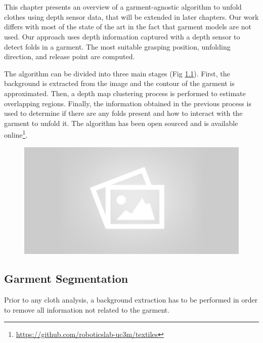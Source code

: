 \chapter{\MyTitle}
\label{architecture}

This chapter presents an overview of a garment-agnostic algorithm to unfold clothes using depth sensor data, that will be extended in later chapters. Our work differs with most of the state of the art in the fact that garment models are not used. Our approach uses depth information captured with a depth sensor to detect folds in a garment. The most suitable grasping position, unfolding direction, and release point are computed.

The algorithm can be divided into three main stages (Fig \ref{fig:pipeline_block_diagram}). First, the  background is extracted from the image and the contour of the garment is approximated. Then, a depth map clustering process is performed to estimate overlapping regions. Finally, the information obtained in the previous process is used to determine if there are any folds present and how to interact with the garment to unfold it. The algorithm has been open sourced and is available online\footnote{\url{https://github.com/roboticslab-uc3m/textiles}}.

\begin{figure}[thpb]
    \centering
    \includegraphics[width=0.8
    \textwidth]{figures/placeholder2.png}
    \caption{}
    \label{fig:pipeline_block_diagram}
\end{figure}

\section{Garment Segmentation}
\label{architecture:garment_segmentation}
Prior to any cloth analysis, a background extraction has to be performed in order to remove all information not related to the garment. 



